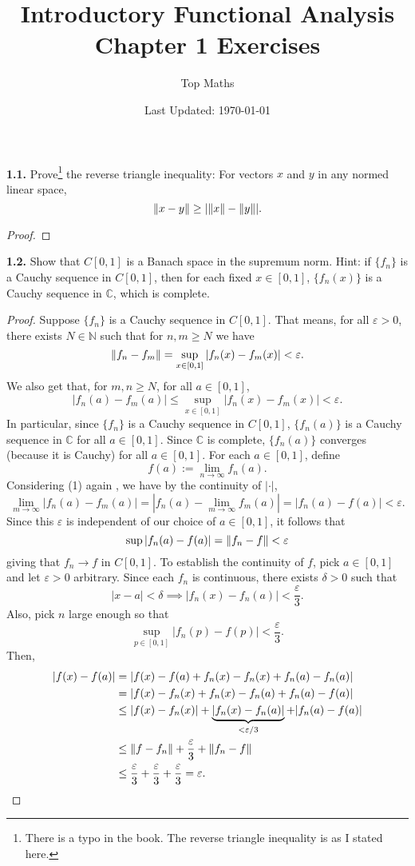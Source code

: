 \documentclass[12pt]{article}
\title{Introductory Functional Analysis \\ Chapter 1 Exercises}
\date{Last Updated: \today}
\author{Top Maths}
\theoremstyle{definition}
\begin{document}
	\maketitle 
	
	\noindent \textbf{1.1.} Prove\footnote{There is a typo in the book. The reverse triangle inequality is as I stated here.} the reverse triangle inequality: For vectors $x$ and $y$ in any normed linear space, $$\norm{x - y} \geq \abs{\norm{x} - \norm{y}}.$$
		\begin{proof}
			
		\end{proof}
	
	\newpage 
	\noindent \textbf{1.2.} Show that $C[0, 1]$ is a Banach space in the supremum norm. Hint: if $\{f_n\}$ is a Cauchy sequence in $C[0, 1]$, then for each fixed $x \in [0, 1]$, $\{f_n(x)\}$ is a Cauchy sequence in $\mathbb{C}$, which is complete.
		\begin{proof}
			Suppose $\{f_n\}$ is a Cauchy sequence in $C[0, 1]$. That means, for all $\varepsilon > 0$, there exists $N \in \mathbb{N}$ such that for $n, m \geq N$ we have $$\norm{f_n - f_m} = \sup_{x \in [0, 1]}|f_n(x) - f_m(x)| < \varepsilon.$$ We also get that, for $m, n \geq N$, for all $a \in [0, 1]$,  \begin{equation} |f_n(a) - f_m(a)| \leq \sup_{x \in [0, 1]} |f_n(x) - f_m(x)| < \varepsilon.\end{equation} In particular, since $\{f_n\}$ is a Cauchy sequence in $C[0, 1]$, $\{f_n(a)\}$ is a Cauchy sequence in $\mathbb{C}$ for all $a \in [0, 1]$. Since $\mathbb{C}$ is complete, $\{f_n(a)\}$ converges (because it is Cauchy) for all $a \in [0, 1]$. For each $a \in [0, 1]$, define $$f(a) := \lim_{n \to \infty} f_n(a).$$ Considering (1) again , we have by the continuity of $|\cdot|$,  $$\lim_{m \to \infty} |f_n(a) - f_m(a)| = |f_n(a) - \lim_{m \to \infty} f_m(a)| = |f_n(a) - f(a)| < \varepsilon.$$ Since this $\varepsilon$ is independent of our choice of $a \in [0, 1]$, it follows that $$\sup |f_n(a) - f(a)| = \norm{f_n - f} < \varepsilon$$ giving that $f_n \to f$ in $C[0, 1]$. To establish the continuity of $f$, pick $a \in [0, 1]$ and let $\varepsilon > 0$ arbitrary. Since each $f_n$ is continuous, there exists $\delta > 0$ such that $$|x - a| < \delta \implies |f_n(x) - f_n(a)| < \frac{\varepsilon}{3}.$$ Also, pick $n$ large enough so that  $$\sup_{p \in [0, 1]}|f_n(p) - f(p)| < \frac{\varepsilon}{3}.$$ Then,
				\begin{align*}
					|f(x) - f(a)| &= |f(x) - f(a) + f_n(x) - f_n(x) + f_n(a) - f_n(a)| \\
					&= |f(x) - f_n(x) + f_n(x) - f_n(a) +f_n(a) - f(a)| \\
					&\leq |f(x) - f_n(x)| + \underbrace{|f_n(x) - f_n(a)|}_{< \varepsilon/3} + |f_n(a) - f(a)| \\
					&\leq \norm{f - f_n} + \frac{\varepsilon}{3} + \norm{f_n - f} \\
					&\leq \frac{\varepsilon}{3} + \frac{\varepsilon}{3} + \frac{\varepsilon}{3} = \varepsilon.
				\end{align*}
		\end{proof} 
\end{document}
